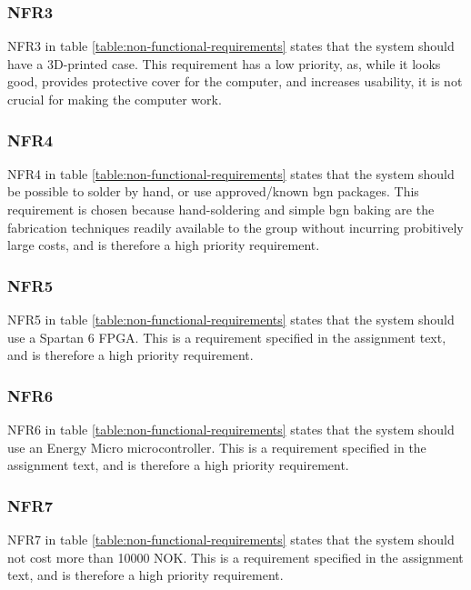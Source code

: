 \subsubsection{NFR3}

NFR3 in table \vref{table:non-functional-requirements} states that the system should have a 3D-printed case.
This requirement has a low priority, as, while it looks good, provides protective cover for the computer, and increases usability, it is not crucial for making the computer work.

\subsubsection{NFR4}

NFR4 in table \vref{table:non-functional-requirements} states that the system should be possible to solder by hand, or use approved/known bgn packages.
This requirement is chosen because hand-soldering and simple bgn baking are the fabrication techniques readily available to the group without incurring probitively large costs, and is therefore a high priority requirement.

\subsubsection{NFR5}

NFR5 in table \vref{table:non-functional-requirements} states that the system should use a Spartan 6 FPGA.
This is a requirement specified in the assignment text, and is therefore a high priority requirement.

\subsubsection{NFR6}

NFR6 in table \vref{table:non-functional-requirements} states that the system should use an Energy Micro microcontroller.
This is a requirement specified in the assignment text, and is therefore a high priority requirement.

\subsubsection{NFR7}

NFR7 in table \vref{table:non-functional-requirements} states that the system should not cost more than 10000 NOK.
This is a requirement specified in the assignment text, and is therefore a high priority requirement.

